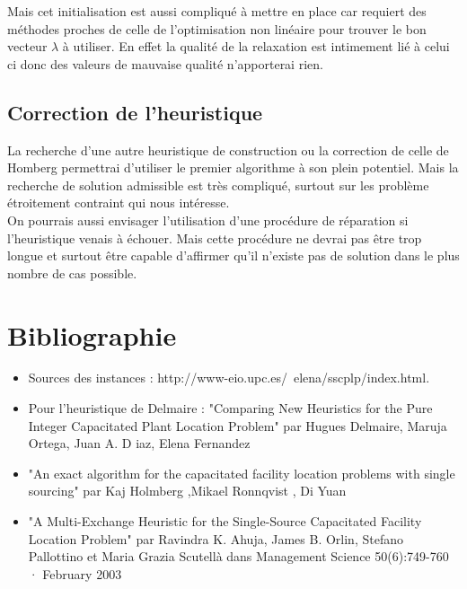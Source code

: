 \documentclass[12pt,a4paper]{article}
\begin{document}
Mais cet initialisation est aussi compliqué à mettre en place car requiert des méthodes proches de celle de l'optimisation non linéaire pour trouver le bon vecteur $\lambda$ à utiliser. En effet la qualité de la relaxation est intimement lié à celui ci donc des valeurs de mauvaise qualité n’apporterai rien.\\

\subsection{Correction de l'heuristique}

La recherche d'une autre heuristique de construction ou la correction de celle de Homberg permettrai d'utiliser le premier algorithme à son plein potentiel. Mais la recherche de solution admissible est très compliqué, surtout sur les problème étroitement contraint qui nous intéresse.\\

On pourrais aussi envisager l'utilisation d'une procédure de réparation si l'heuristique venais à échouer. Mais cette procédure ne devrai pas être trop longue et surtout être capable d'affirmer qu'il n'existe pas de solution dans le plus nombre de cas possible.\\

\section*{Bibliographie}

\begin{itemize}
\item
Sources des instances : http://www-eio.upc.es/~elena/sscplp/index.html.\\
\item
Pour l'heuristique de Delmaire : "Comparing New Heuristics for the Pure Integer Capacitated Plant Location Problem" par Hugues Delmaire, Maruja Ortega, Juan A. D iaz, Elena Fernandez 
\item
"An exact algorithm for the capacitated facility location problems with single sourcing" par Kaj Holmberg ,Mikael Ronnqvist , Di Yuan
\item
"A Multi-Exchange Heuristic for the Single-Source Capacitated Facility Location Problem" par Ravindra K. Ahuja, James B. Orlin, Stefano Pallottino et Maria Grazia Scutellà dans Management Science 50(6):749-760 · February 2003
\end{itemize}
\end{document}
